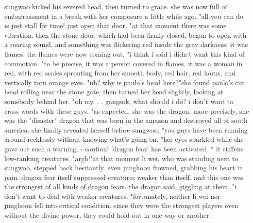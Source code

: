  sungwoo kicked his severed head, then turned to grace.
 she was now full of embarrassment in a break with her composure a little while ago.
"all you can do is just stall for time! just open that door.
"at that moment there was some vibration.
 then the stone door, which had been firmly closed, began to open with a roaring sound.
 and something was flickering red inside the grey darkness.
it was flames.
 the flames were now coming out.
"i think i said i didn't want this kind of commotion.
"to be precise, it was a person covered in flames.
 it was a woman in red, with red scales sprouting from her smooth body, red hair, red horns, and vertically torn orange eyes.
"uh? why is paulo's head here?"she found paulo's cut head rolling near the stone gate, then turned her head slightly, looking at somebody behind her.
"oh my.
.
.
gangsok, what should i do? i don't want to cross words with these guys.
"as expected, she was the dragon.
more precisely, she was the "disaster" dragon that was born in the amazon and destroyed all of south america.
she finally revealed herself before sungwoo.
"you guys have been running around recklessly without knowing what's going on.
"her eyes sparkled while she gave out such a warning.
 - caution! 'dragon fear' has been activated.
* it stiffens low-ranking creatures.
"argh!"at that moment li wei, who was standing next to sungwoo, stepped back hesitantly.
 even junghoon frowned, grabbing his heart in pain.
 dragon fear itself suppressed creatures weaker than itself.
 and this one was the strongest of all kinds of dragon fears.
 the dragon said, giggling at them, "i don't want to deal with weaker creatures.
"fortunately, neither li wei nor junghoon fell into critical condition.
since they were the strongest players even without the divine power, they could hold out in one way or another.


